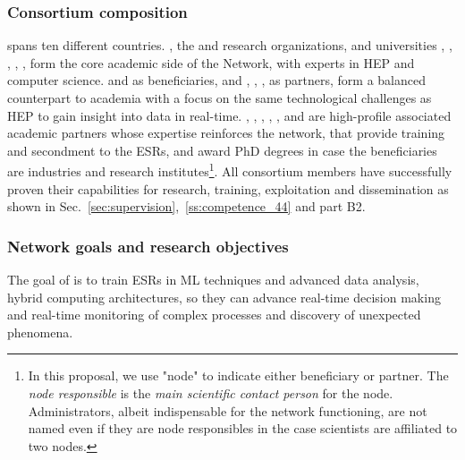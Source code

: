 \vskip-20pt

\subsubsection*{Consortium composition}

\acronym spans ten different countries. 
\cernentity, the \nikhefentity and \cnrsentity research organizations, and universities \sorbonneentity, \helsinkientity, \unigeentity, \dortmundentity, \lundentity, \heidelbergentity form the core academic side of the Network, with experts in HEP and computer science.
\ibmentity and \fleetmaticsentity as beneficiaries, and \ximantisentity, \lightboxentity, \pointeightentity, as partners, form a balanced counterpart to academia with a focus on the same technological challenges as HEP to gain insight into data in real-time. 
\oregonentity, \ohioentity, \pisaentity, \santiagoentity, \liegesentity, \radboudentity and \amsterdamentity are high-profile associated academic partners whose expertise reinforces the network, that provide training and secondment to the ESRs, and award PhD degrees in case the beneficiaries are industries and research institutes\footnote{In this proposal, we use "node" to indicate
either beneficiary or partner. The \textit{node responsible} is the \textit{main scientific contact person} for the node. Administrators, albeit indispensable for the network functioning, are not named even if they are node responsibles in the case scientists are affiliated to two nodes.}.
All consortium members have successfully proven their capabilities for research, training, exploitation and dissemination as shown in Sec.~\ref{sec:supervision},~\ref{ss:competence_44} and part B2.

\subsubsection*{Network goals and research objectives}

The goal of \acronym is to train ESRs in ML techniques and advanced data analysis, hybrid computing architectures, so they can advance real-time decision making and real-time monitoring of complex processes and discovery of unexpected phenomena.

